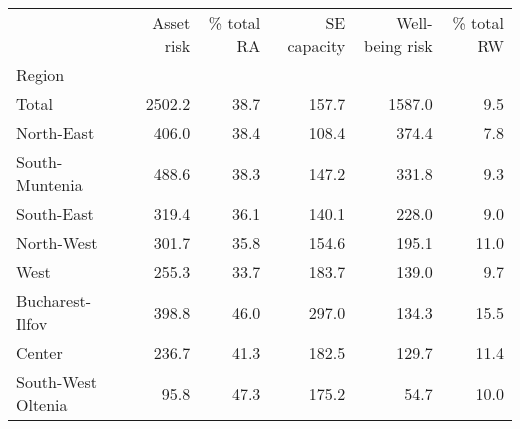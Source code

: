 \begin{tabular}{lrrrrr}
\toprule
{} &  Asset risk &  \% total RA &  SE capacity &  Well-being risk &  \% total RW \\
Region             &             &             &              &                  &             \\
\midrule
Total              &      2502.2 &        38.7 &        157.7 &           1587.0 &         9.5 \\
North-East         &       406.0 &        38.4 &        108.4 &            374.4 &         7.8 \\
South-Muntenia     &       488.6 &        38.3 &        147.2 &            331.8 &         9.3 \\
South-East         &       319.4 &        36.1 &        140.1 &            228.0 &         9.0 \\
North-West         &       301.7 &        35.8 &        154.6 &            195.1 &        11.0 \\
West               &       255.3 &        33.7 &        183.7 &            139.0 &         9.7 \\
Bucharest-Ilfov    &       398.8 &        46.0 &        297.0 &            134.3 &        15.5 \\
Center             &       236.7 &        41.3 &        182.5 &            129.7 &        11.4 \\
South-West Oltenia &        95.8 &        47.3 &        175.2 &             54.7 &        10.0 \\
\bottomrule
\end{tabular}

